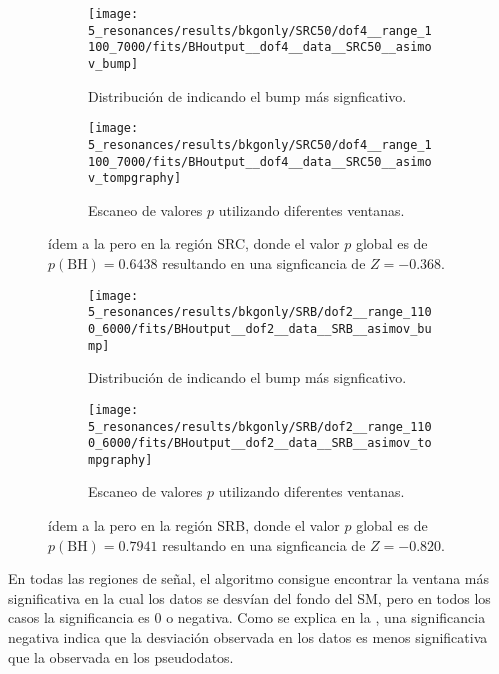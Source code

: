 \begin{figure}[ht!]
    \centering
    \begin{subfigure}[t]{0.49\linewidth}
        \centering
        \texttt{[image: 5\_resonances/results/bkgonly/SRC50/dof4\_\_range\_1100\_7000/fits/BHoutput\_\_dof4\_\_data\_\_SRC50\_\_asimov\_bump]}
        \caption{Distribución de \myj indicando el bump más signficativo.}
    \end{subfigure}
    \hfill
    \begin{subfigure}[t]{0.49\linewidth}
        \centering
        \texttt{[image: 5\_resonances/results/bkgonly/SRC50/dof4\_\_range\_1100\_7000/fits/BHoutput\_\_dof4\_\_data\_\_SRC50\_\_asimov\_tompgraphy]}
        \caption{Escaneo de valores \(p\) utilizando diferentes ventanas.}
    \end{subfigure}
    \caption{ídem a la \Fig{\ref{fig:results:results:bkgonly:bh:SR}} pero en la región SRC, donde el valor \(p\) global es de \(p(\text{BH}) = 0.6438\) resultando en una signficancia de \(Z=-0.368\).}
    \label{fig:results:results:bkgonly:bh:SRC}
\end{figure}

\begin{figure}[ht!]
    \centering
    \begin{subfigure}[t]{0.49\linewidth}
        \centering
        \texttt{[image: 5\_resonances/results/bkgonly/SRB/dof2\_\_range\_1100\_6000/fits/BHoutput\_\_dof2\_\_data\_\_SRB\_\_asimov\_bump]}
        \caption{Distribución de \myj indicando el bump más signficativo.}
    \end{subfigure}
    \hfill
    \begin{subfigure}[t]{0.49\linewidth}
        \centering
        \texttt{[image: 5\_resonances/results/bkgonly/SRB/dof2\_\_range\_1100\_6000/fits/BHoutput\_\_dof2\_\_data\_\_SRB\_\_asimov\_tompgraphy]}
        \caption{Escaneo de valores \(p\) utilizando diferentes ventanas.}
    \end{subfigure}
    \caption{ídem a la \Fig{\ref{fig:results:results:bkgonly:bh:SR}} pero en la región SRB, donde el valor \(p\) global es de \(p(\text{BH}) = 0.7941\) resultando en una signficancia de \(Z=-0.820\).}
    \label{fig:results:results:bkgonly:bh:SRB}
\end{figure}

En todas las regiones de señal, el algoritmo \bh consigue encontrar la ventana más significativa en la cual los datos se desvían del fondo del \ac{SM}, pero en todos los casos la significancia es 0 o negativa. Como se explica en la \Sect{\ref{subsec:strategy:stat_treatment:bh}}, una significancia negativa indica que la desviación observada en los datos es menos significativa que la observada en los pseudodatos.

